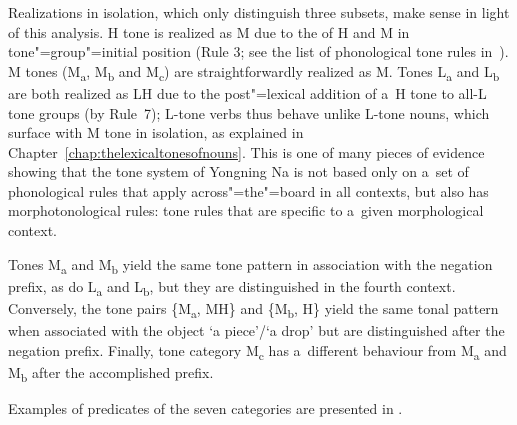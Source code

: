 \largerpage
Realizations in isolation, which only distinguish three subsets, make sense in light of this analysis. H tone is
realized as M due to the  of H and M in tone"=group"=initial position (Rule 3; see the list of phonological tone rules in~). M tones (M\textsubscript{a}, M\textsubscript{b} and M\textsubscript{c}) are straightforwardly realized as M. Tones L\textsubscript{a} and L\textsubscript{b} are both realized as LH due
to the post"=lexical addition of a~H tone to all-L tone groups (by Rule~7); L-tone verbs thus behave unlike L-tone nouns, which surface with M tone in isolation, as explained in Chapter~\ref{chap:thelexicaltonesofnouns}. This is
one of many pieces of evidence showing that the tone system of Yongning Na is not based only on a~set of
phonological rules that apply across"=the"=board in all contexts, but also has morphotonological rules: tone rules that are specific to a~given morphological context.

Tones M\textsubscript{a} and M\textsubscript{b} yield the same
tone pattern in association with the {negation} prefix, as do L\textsubscript{a} and L\textsubscript{b}, but they are distinguished in the
fourth context. Conversely, the tone pairs \{M\textsubscript{a}, MH\} and \{M\textsubscript{b}, H\} yield the same tonal pattern when associated
with the object ‘a piece’/‘a drop’ but are distinguished after the {negation} prefix. Finally, tone category M\textsubscript{c} has a~different behaviour from M\textsubscript{a} and M\textsubscript{b} after the {accomplished} prefix.

Examples of predicates of the seven categories are presented in .

